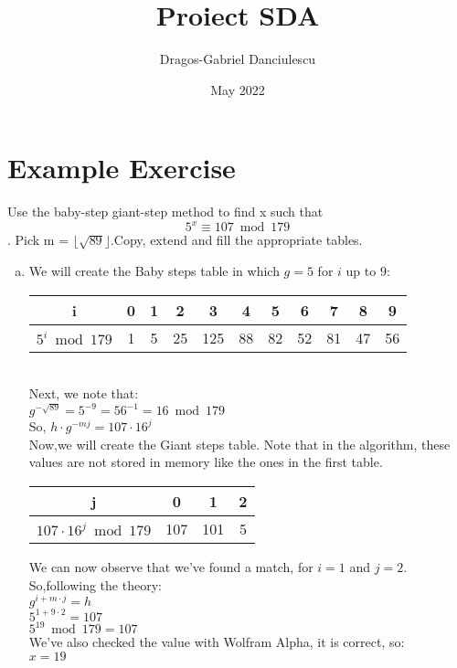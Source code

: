\documentclass{article}
\title{Proiect SDA}
\author{Dragos-Gabriel Danciulescu}
\date{May 2022}
\begin{document}
\maketitle

\section*{Example Exercise}

Use the baby-step giant-step method to find x such that   $$ 5^{x} \equiv 107 \bmod{179} $$. Pick m = $\lfloor\sqrt{89}\rfloor$.Copy, extend and fill the
appropriate tables.\\
\begin{enumerate}[a.]
    \item
We will create the Baby steps table in which $g=5$ for $i$ up to $9$:\\
\begin{tabular}{ |c|c|c|c|c|c|c|c|c|c|c| }
 \hline
 i & 0 & 1 & 2 & 3 & 4 & 5 & 6 & 7 & 8 & 9 \\
 \hline
 $5^i \bmod 179$ & 1 & 5 & 25 & 125 & 88 & 82 & 52 & 81 & 47 &  56\\
 \hline

\end{tabular}
\\
Next, we note that:\\
$g^{-\sqrt{89}}=5^{-9}=56^{-1}=16 \bmod 179$\\
So, $h \cdot g^{-mj} = 107 \cdot 16^j$\\
Now,we will create the Giant steps table. Note that in the algorithm, these values are not stored in memory like the ones in the first table.\\
\begin{tabular}{ |c|c|c|c| }
 \hline
 j & 0 & 1 & 2\\
 \hline
 $107 \cdot 16^j \bmod 179$ & 107 & 101 & 5\\
 \hline

\end{tabular}
We can now observe that we've found a match, for $i=1$ and $j=2$.\\
So,following the theory:\\
$g^{i+m \cdot j}=h$\\
$5^{1+9 \cdot 2}=107$\\
$5^{19} \bmod 179 = 107$\\
We've also checked the value with Wolfram Alpha, it is correct, so:\\
$x=19$\\

\end{enumerate}
\end{document}
